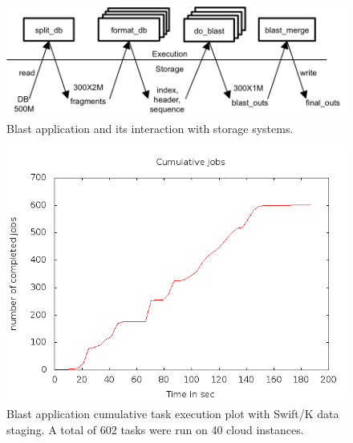 \documentclass[10pt,journal,cspaper,compsoc]{IEEEtran}
\begin{document}
\begin{figure}[htb]
\begin{center}
\includegraphics[width=\linewidth]{figures/blast.png}
\caption{Blast application and its interaction with storage systems. 
\label{fig_blast}
}
\end{center}
\end{figure}

\begin{figure}[htb]
\begin{center}
\includegraphics[width=\linewidth]{plots/blast_40i_80c.png}
\caption{Blast application cumulative task execution plot with Swift/K data staging. A total of 602 tasks were run on 40 cloud instances. 
\label{fig_blast_k}
}
\end{center}
\end{figure}
\end{document}
